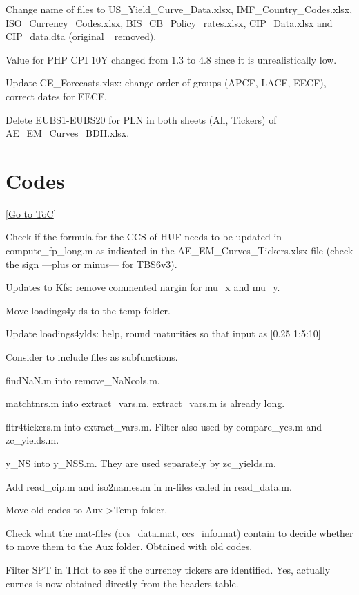 \documentclass[12pt]{article}
\newcommand{\gototoc}{\vspace{-1.8cm} \null\hfill [\hyperlink{toc}{Go to ToC}] \newline}
\newcommand{\cmark}{\ding{51}}
\newcommand{\xmark}{\ding{55}}
\newcommand{\done}{\rlap{$\square$}{\raisebox{2pt}{\large\hspace{1pt}\cmark}}%
	\hspace{-2.5pt}}
\newcommand{\wontdo}{\rlap{$\square$}{\large\hspace{1pt}\xmark}}
\begin{document}
\begin{todolist}
\begin{todolist}
	\end{todolist}
	\item[\done] Change name of files to US_Yield_Curve_Data.xlsx, IMF_Country_Codes.xlsx, ISO_Currency_Codes.xlsx, BIS_CB_Policy_rates.xlsx, CIP_Data.xlsx and CIP_data.dta (original_ removed).
	\item[\done] Value for PHP CPI 10Y changed from 1.3 to 4.8 since it is unrealistically low.
	\item[\done] Update CE_Forecasts.xlsx: change order of groups (APCF, LACF, EECF), correct dates for EECF.
	\item[\done] Delete EUBS1-EUBS20 for PLN in both sheets (All, Tickers) of AE_EM_Curves_BDH.xlsx.
\end{todolist}

\section{Codes}
\gototoc
\begin{todolist}
	\item Check if the formula for the CCS of HUF needs to be updated in compute_fp_long.m as indicated in the AE_EM_Curves_Tickers.xlsx file (check the sign ---plus or minus--- for TBS6v3).
	\item[\done] Updates to Kfs: remove commented nargin for mu_x and mu_y.
	\item[\done] Move loadings4ylds to the temp folder.
	\item[\done] Update loadings4ylds: help, round maturities so that input as [0.25 1:5:10]
	\item[\done] Consider to include files as subfunctions.
	\begin{todolist}
		\item[\done] findNaN.m into remove_NaNcols.m.
		\item[\wontdo] matchtnrs.m into extract_vars.m. extract_vars.m is already long.
		\item[\wontdo] fltr4tickers.m into extract_vars.m. Filter also used by compare_ycs.m and zc_yields.m.
		\item[\wontdo] y_NS into y_NSS.m. They are used separately by zc_yields.m.
	\end{todolist}
	\item[\done] Add read_cip.m and iso2names.m in m-files called in read_data.m.
	\item[\done] Move old codes to Aux->Temp folder.
	\item[\wontdo] Check what the mat-files (ccs_data.mat, ccs_info.mat) contain to decide whether to move them to the Aux folder. Obtained with old codes.
	\item[\done] Filter SPT in THdt to see if the currency tickers are identified. Yes, actually curncs is now obtained directly from the headers table.
\end{todolist}
\end{document}
